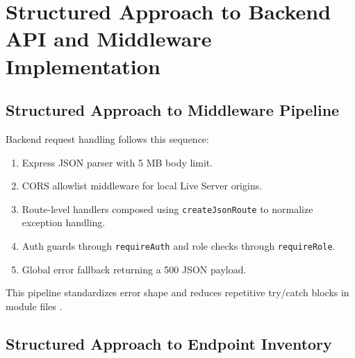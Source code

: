 \section{Structured Approach to Backend API and Middleware Implementation}

\subsection{Structured Approach to Middleware Pipeline}

Backend request handling follows this sequence:
\begin{enumerate}[leftmargin=1.5em]
  \item Express JSON parser with 5 MB body limit.
  \item CORS allowlist middleware for local Live Server origins.
  \item Route-level handlers composed using \texttt{createJsonRoute} to normalize exception handling.
  \item Auth guards through \texttt{requireAuth} and role checks through \texttt{requireRole}.
  \item Global error fallback returning a 500 JSON payload.
\end{enumerate}

This pipeline standardizes error shape and reduces repetitive try/catch blocks in module files \cite{repo-server-app,repo-security}.

\subsection{Structured Approach to Endpoint Inventory}

